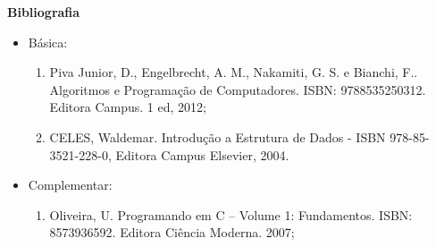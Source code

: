 




\begin{snugshade}\begin{center}\textbf{
    Bibliografia
}\end{center}\end{snugshade}

\begin{itemize} 
  \item Básica:
	\begin{enumerate}
		\item Piva Junior, D., Engelbrecht,  A. M., Nakamiti,  G. S. e Bianchi, F.. Algoritmos e Programação de Computadores. ISBN: 9788535250312. Editora Campus. 1 ed, 2012;
		\item CELES, Waldemar. Introdução a Estrutura de Dados -  ISBN 978-85-3521-228-0, Editora Campus Elsevier, 2004.
	\end{enumerate}
  \item Complementar:
	\begin{enumerate} 
		\item Oliveira, U. Programando em C – Volume 1: Fundamentos. ISBN: 8573936592. Editora Ciência Moderna. 2007;
	\end{enumerate}
\end{itemize}

